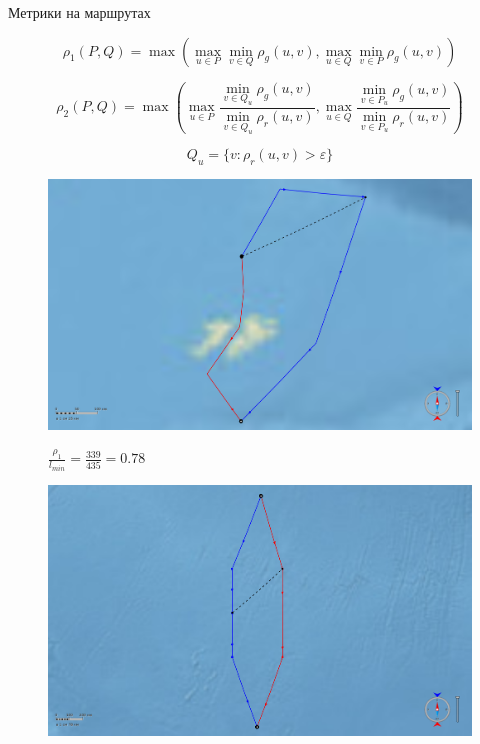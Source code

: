 \documentclass[russian, hyperref={unicode}]{beamer}
\theoremstyle{definition}
\begin{document}
\begin{frame}{Метрики на маршрутах}
     {
        \begin{equation*}
            \rho_1 (P, Q) = \max(\max_{u \in P} \min_{v \in Q} \rho_g(u,
            v), \max_{u \in Q} \min_{v \in P} \rho_g(u, v))
        \end{equation*}

        \begin{equation*}
            \rho_2 (P, Q) = \max(\max_{u \in P} \frac{\min\limits_{v \in Q_u}
            \rho_g(u, v)}{\min\limits_{v \in Q_u} \rho_r(u, v)}, \max\limits_{u \in Q} \frac{\min\limits_{v \in P_u}
            \rho_g(u, v)}{\min\limits_{v \in P_u} \rho_r(u, v)})
        \end{equation*}
        
        \begin{equation*}
            Q_u = \{ v : \rho_r(u, v) > \varepsilon \}
        \end{equation*}
    }
     {
        \begin{figure}
            \includegraphics[width=.95\textwidth]{Solution/metrics/1-dissimilar}
            
            $\frac{\rho_1}{l_{min}} = \frac{339}{435} = 0.78$
        \end{figure}
    }
     {
        \begin{figure}
            \includegraphics[width=.9\textwidth]{Solution/metrics/1-uncertain-2-similar}
            

\end{figure}}
\end{frame}
\end{document}
